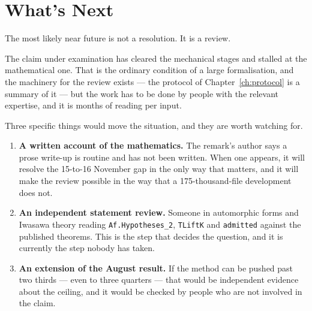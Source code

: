 
\backmatter

\chapter*{What's Next}
\thispagestyle{plain}

The most likely near future is not a resolution. It is a review.

The claim under examination has cleared the mechanical stages and stalled at
the mathematical one. That is the ordinary condition of a large formalisation,
and the machinery for the review exists --- the protocol of Chapter~\ref{ch:protocol}
is a summary of it --- but the work has to be done by people with the relevant
expertise, and it is months of reading per input.

Three specific things would move the situation, and they are worth watching
for.

\begin{enumerate}
\item \textbf{A written account of the mathematics.} The remark's author says
a prose write-up is routine and has not been written. When one appears, it
will resolve the 15-to-16 November gap in the only way that matters, and it
will make the review possible in the way that a 175-thousand-file development
does not.

\item \textbf{An independent statement review.} Someone in automorphic forms
and Iwasawa theory reading \texttt{Af.Hypotheses\_2}, \texttt{TLiftK} and
\texttt{admitted} against the published theorems. This is the step that
decides the question, and it is currently the step nobody has taken.

\item \textbf{An extension of the August result.} If the method can be pushed
past two thirds --- even to three quarters --- that would be independent
evidence about the ceiling, and it would be checked by people who are not
involved in the claim.
\end{enumerate}

